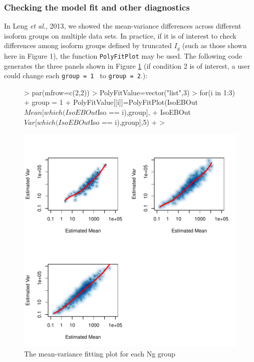 \documentclass{article}
\begin{document}
\subsubsection{Checking the model fit and other diagnostics}
\label{sec:detailedisodeplot}
In Leng {\it et al.}, 2013\citep{Leng13}, we showed the mean-variance differences across different 
isoform groups on multiple data sets. 
In practice, if it is of interest to check differences among 
isoform groups defined by truncated $I_g$ (such as those shown here
in Figure 1), the function \verb+PolyFitPlot+ may be used. 
The following code generates the three
panels shown in Figure \ref{fig:IsoSimuNgEach}
(if condition 2 is of interest, a user could change each \verb+group = 1 + to \verb+group = 2+.):
\begin{figure}[h!]
\centering
\begin{Schunk}
\begin{Sinput}
> par(mfrow=c(2,2))
> PolyFitValue=vector("list",3)
> for(i in 1:3){
+   group = 1
+   PolyFitValue[[i]]=PolyFitPlot(IsoEBOut$Mean[which(IsoEBOut$Iso == i),group], 
+     IsoEBOut$Var[which(IsoEBOut$Iso == i),group],5)
+ }
>     
\end{Sinput}
\end{Schunk}
\includegraphics{EBSeq_Vignette-032}
\caption{ The mean-variance fitting plot for each Ng group}
\label{fig:IsoSimuNgEach}
\end{figure}
\end{document}
